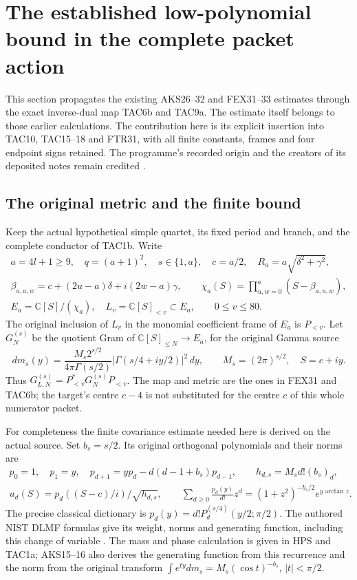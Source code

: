 \begingroup
\section{The established low-polynomial bound in the complete packet action}
\label{sec:LRP}

This section propagates the existing AKS26--32 and FEX31--33 estimates
through the exact inverse-dual map TAC6b and TAC9a. The estimate itself
belongs to those earlier calculations. The contribution here is its
explicit insertion into TAC10, TAC15--18 and FTR31, with all finite
constants, frames and four endpoint signs retained. The programme's
recorded origin and the creators of its deposited notes remain credited
\cite{human:globalization2026,human:splitzero2026}.

\subsection{The original metric and the finite bound}

Keep the actual hypothetical simple quartet, its fixed period and branch,
and the complete conductor of TAC1b. Write
\[
\begin{gathered}
 a=4l+1\ge9,\quad q=(a+1)^2,\quad s\in\{1,a\},\quad
 c=a/2,\quad R_a=a\sqrt{\delta^2+\gamma^2},\\
 \beta_{a,u,w}=c+(2u-a)\delta+i(2w-a)\gamma,\qquad
 \chi_a(S)=\prod_{u,w=0}^{a}(S-\beta_{a,u,w}),\\
 E_a=\mathbb C[S]/(\chi_a),\quad
 L_v=\mathbb C[S]_{<v}\subset E_a,\qquad 0\le v\le80.
\end{gathered}\tag{LRP1}
\]
The original inclusion of $L_v$ in the monomial coefficient frame of
$E_a$ is $P_{<v}$. Let $G_N^{(s)}$ be the quotient Gram of
$\mathbb C[S]_{\le N}\to E_a$, for the original Gamma source
\[
 dm_s(y)=\frac{M_s2^{s/2}}{4\pi\Gamma(s/2)}
    |\Gamma(s/4+iy/2)|^2\,dy,\qquad M_s=(2\pi)^{s/2},\quad S=c+iy.
 \tag{LRP2}
\]
Thus $G_{L,N}^{(s)}=P_{<v}^*G_N^{(s)}P_{<v}$. The map and metric are
the ones in FEX31 and TAC6b; the target's centre $c-4$ is not substituted
for the centre $c$ of this whole numerator packet.

For completeness the finite covariance estimate needed here is derived
on the actual source. Set $b_s=s/2$. Its original orthogonal polynomials
and their norms are
\[
\begin{gathered}
 p_0=1,\quad p_1=y,\quad
 p_{d+1}=yp_d-d(d-1+b_s)p_{d-1},\qquad h_{d,s}=M_s d!(b_s)_d,\\
 u_d(S)=p_d((S-c)/i)/\sqrt{h_{d,s}},\qquad
 \sum_{d\ge0}\frac{p_d(y)}{d!}z^d
       =(1+z^2)^{-b_s/2}e^{y\arctan z}.
\end{gathered}\tag{LRP3}
\]
The precise classical dictionary is
$p_d(y)=d!P_d^{(s/4)}(y/2;\pi/2)$.
The authored NIST DLMF formulas give its weight, norms and generating
function, including this change of variable
\cite[eqs.~(18.19.8)--(18.19.9), (18.23.7)]{human:dlmf18}.
The mass and phase calculation is given in HPS and TAC1a; AKS15--16
also derives the generating function from this recurrence and the norm
from the original transform
$\int e^{ty}dm_s=M_s(\cos t)^{-b_s}$, $|t|<\pi/2$.

